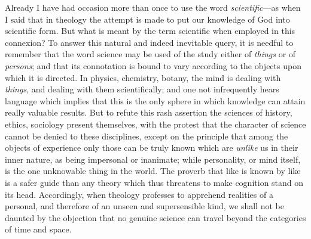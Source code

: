 \documentclass[12pt,a5paper]{article}
\begin{document}
Already I have had occasion more than once to use the
word \textit{scientific}---as when I said that in theology the attempt
is made to put our knowledge of God into scientific form.
But what is meant by the term scientific when employed
in this connexion? To answer this natural and indeed
inevitable query, it is needful to remember that the word
science may be used of the study either of \textit{things} or of
\textit{persons}; and that its connotation is bound to vary according
to the objects upon which it is directed. In physics,
chemistry, botany, the mind is dealing with \textit{things}, and
dealing with them scientifically; and one not infrequently
hears language which implies that this is the
only sphere in which knowledge can attain really valuable
results. But to refute this rash assertion the sciences of
history, ethics, sociology present themselves, with the protest
that the character of science cannot be denied to these
disciplines, except on the principle that among the objects of
experience only those can be truly known which are \textit{unlike}
us in their inner nature, as being impersonal or inanimate;
while personality, or mind itself, is the one unknowable
thing in the world. The proverb that like is known by
like is a safer guide than any theory which thus threatens
to make cognition stand on its head. Accordingly, when
theology professes to apprehend realities of a personal, and
therefore of an unseen and supersensible kind, we shall
not be daunted by the objection that no genuine science
can travel beyond the categories of time and space.
\end{document}
